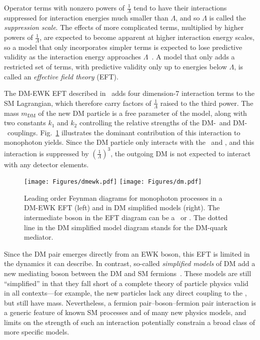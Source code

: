 Operator terms with nonzero powers of $\frac{1}{\Lambda}$ tend to have their interactions suppressed for interaction energies much
smaller than $\Lambda$, and so $\Lambda$ is called the \textit{suppression scale}. The effects of more complicated terms, multiplied by higher powers of $\frac{1}{\Lambda}$,
are expected to become apparent at higher interaction energy scales, so a model that only incorporates simpler terms is expected to
lose predictive validity as the interaction energy approaches $\Lambda$~\cite{ref:j.aop.2013.04.016}. A model that only adds a restricted set of terms,
with predictive validity only up to energies below $\Lambda$, is called an \textit{effective field theory} (EFT).

The DM-EWK EFT described in~\cite{ref:PhysRevD.89.056011} adds four dimension-7 interaction terms to the SM Lagrangian, which therefore carry factors of $\frac{1}{\Lambda}$
raised to the third power. The mass $m_\mathrm{DM}$ of the new DM particle is a free parameter of the model, along with two constants $k_1$ and $k_2$ controlling
the relative strengths of the DM-\PZ\ and DM-\Pgamma\ couplings.
Fig.~\ref{fig:dm_diagrams} illustrates the dominant contribution of this interaction to monophoton yields. Since the DM
particle only interacts with the \PZ\ and \Pgamma, and this interaction is suppressed by $(\frac{1}{\Lambda})^{3}$, the outgoing DM is not expected to interact
with any detector elements.

\begin{figure}[hbtp]
  \begin{center}
    \texttt{[image: Figures/dmewk.pdf]}
    \texttt{[image: Figures/dm.pdf]}
    \caption{
      Leading order Feynman diagrams for monophoton processes in a DM-EWK EFT (left) and in DM simplified models (right).
      The intermediate boson in the EFT diagram can be a \PZ\ or \Pgamma. The dotted line in the DM simplified model diagram
      stands for the DM-quark mediator.
    }
    \label{fig:dm_diagrams}
  \end{center}
\end{figure}

Since the DM pair emerges directly from an EWK boson, this EFT is limited in the dynamics it can describe. In contrast, so-called \textit{simplified models} of DM add
a new mediating boson between the DM and SM fermions~\cite{ref:1507.00966}. These models are still ``simplified'' in that they fall short of a complete theory of particle
physics valid in all contexts---for example, the new particles lack any direct coupling to the \PH, but still have mass.
Nevertheless, a fermion pair--boson--fermion pair interaction is a generic feature of known SM processes
and of many new physics models, and limits on the strength of such an interaction potentially constrain a broad class of more specific models.

